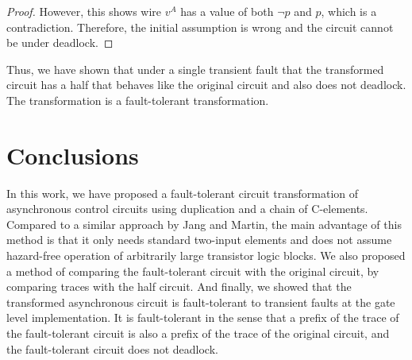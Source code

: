 \documentclass[12pt]{report}
\newtheorem*{theorem}{Theorem}
\begin{document}
\begin{proof}
However, this shows wire $v^A$ has a value of both $\neg{p}$ and $p$, which is a contradiction.  Therefore, the initial assumption is wrong and the circuit cannot be under deadlock.

\end{proof}



%
%

Thus, we have shown that under a single transient fault that the transformed circuit has a half that behaves like the original circuit and also does not deadlock.  The transformation is a fault-tolerant transformation.


\chapter{Conclusions}
In this work, we have proposed a fault-tolerant circuit transformation of asynchronous control circuits using duplication and a chain of C-elements.  Compared to a similar approach by Jang and Martin, the main advantage of this method is that it only needs standard two-input elements and does not assume hazard-free operation of arbitrarily large transistor logic blocks.  We also proposed a method of comparing the fault-tolerant circuit with the original circuit, by comparing traces with the half circuit.  And finally, we showed that the transformed asynchronous circuit is fault-tolerant to transient faults at the gate level implementation.  It is fault-tolerant in the sense that a prefix of the trace of the fault-tolerant circuit is also a prefix of the trace of the original circuit, and the fault-tolerant circuit does not deadlock.\\
\end{document}
